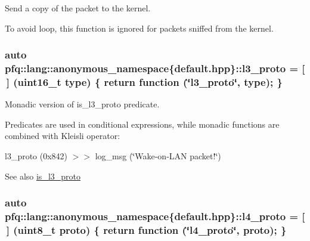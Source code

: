 Send a copy of the packet to the kernel. 

To avoid loop, this function is ignored for packets sniffed from the kernel. 
\subsubsection[{\texorpdfstring{l3\+\_\+proto}{l3_proto}}]{\setlength{\rightskip}{0pt plus 5cm}auto pfq\+::lang\+::anonymous\+\_\+namespace\{default.\+hpp\}\+::l3\+\_\+proto = \mbox{[}$\,$\mbox{]} (uint16\+\_\+t type) \{ return {\bf function} (\char`\"{}l3\+\_\+proto\char`\"{}, type); \}}\hypertarget{namespacepfq_1_1lang_1_1anonymous__namespace_02default_8hpp_03_a1515f230673119530cd04f213627976f}{}\label{namespacepfq_1_1lang_1_1anonymous__namespace_02default_8hpp_03_a1515f230673119530cd04f213627976f}


Monadic version of {\ttfamily is\+\_\+l3\+\_\+proto} predicate. 

Predicates are used in conditional expressions, while monadic functions are combined with Kleisli operator\+:

l3\+\_\+proto (0x842) $>$$>$ log\+\_\+msg (\char`\"{}\+Wake-\/on-\/\+L\+A\+N packet!\char`\"{})

\begin{DoxySeeAlso}{See also}
\hyperlink{namespacepfq_1_1lang_1_1anonymous__namespace_02default_8hpp_03_a814bb9c3c833dc2af342d695b1d503e8}{is\+\_\+l3\+\_\+proto} 
\end{DoxySeeAlso}
\subsubsection[{\texorpdfstring{l4\+\_\+proto}{l4_proto}}]{\setlength{\rightskip}{0pt plus 5cm}auto pfq\+::lang\+::anonymous\+\_\+namespace\{default.\+hpp\}\+::l4\+\_\+proto = \mbox{[}$\,$\mbox{]} (uint8\+\_\+t proto) \{ return {\bf function} (\char`\"{}l4\+\_\+proto\char`\"{}, proto); \}}\hypertarget{namespacepfq_1_1lang_1_1anonymous__namespace_02default_8hpp_03_a8ad2208c91dc3cd4378e715aab5fb4b7}{}\label{namespacepfq_1_1lang_1_1anonymous__namespace_02default_8hpp_03_a8ad2208c91dc3cd4378e715aab5fb4b7}



